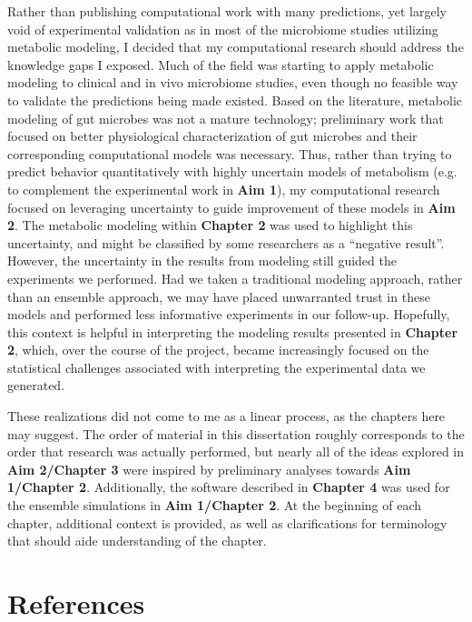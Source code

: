 \documentclass[11pt,twocolumn,notitlepage,openany,twoside]{book}
\begin{document}
\begin{refsection}
Rather than publishing computational work with many predictions, yet largely void of experimental validation as in most of the microbiome studies utilizing metabolic modeling, I decided that my computational research should address the knowledge gaps I exposed. Much of the field was starting to apply metabolic modeling to clinical and in vivo microbiome studies, even though no feasible way to validate the predictions being made existed. Based on the literature, metabolic modeling of gut microbes was not a mature technology; preliminary work that focused on better physiological characterization of gut microbes and their corresponding computational models was necessary. Thus, rather than trying to predict behavior quantitatively with highly uncertain models of metabolism (e.g. to complement the experimental work in \textbf{Aim 1}), my computational research focused on leveraging uncertainty to guide improvement of these models in \textbf{Aim 2}. The metabolic modeling within \textbf{Chapter 2} was used to highlight this uncertainty, and might be classified by some researchers as a “negative result”. However, the uncertainty in the results from modeling still guided the experiments we performed. Had we taken a traditional modeling approach, rather than an ensemble approach, we may have placed unwarranted trust in these models and performed less informative experiments in our follow-up. Hopefully, this context is helpful in interpreting the modeling results presented in \textbf{Chapter 2}, which, over the course of the project, became increasingly focused on the statistical challenges associated with interpreting the experimental data we generated.

These realizations did not come to me as a linear process, as the chapters here may suggest. The order of material in this dissertation roughly corresponds to the order that research was actually performed, but nearly all of the ideas explored in \textbf{Aim 2/Chapter 3} were inspired by preliminary analyses towards \textbf{Aim 1/Chapter 2}. Additionally, the software described in \textbf{Chapter 4} was used for the ensemble simulations in \textbf{Aim 1/Chapter 2}. At the beginning of each chapter, additional context is provided, as well as clarifications for terminology that should aide understanding of the chapter.

\section{References}

\printbibliography[heading=none]
\end{refsection}
\end{document}
